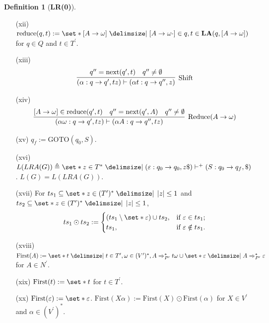 \documentclass[12pt]{paper}
\theoremstyle{definition}
\newtheorem*{definition}{Definition}
\begin{document}
\begin{definition}[\textbf{LR(0)}]
\begin{enumerate}
\item[(xii)] $\mathrm{reduce} ( q , t ) := \set*{ [ A \to \omega ] \mid [ A \to \omega \cdot ] \in q , t \in \mathbf{LA} ( q , [ A \to \omega ] ) }$ for $q \in Q$ and $t \in T^\prime$.
\item[(xiii)] $$\infer[\mathrm{Shift}]{ ( \alpha : q \to q^\prime , t z ) \vdash ( \alpha t : q \to q^{\prime \prime} , z ) }{ q^{\prime \prime} = \mathrm{next} ( q^\prime , t ) & q^{\prime \prime} \ne \emptyset }$$
\item[(xiv)] $$\infer[\mathrm{Reduce} (A \to \omega)]{ ( \alpha \omega : q \to q^\prime , t z ) \vdash ( \alpha A : q \to q^{\prime \prime} , t z ) }{ [ A \to \omega ] \in \mathrm{reduce} ( q^\prime , t ) & q^{\prime \prime} = \mathrm{next} ( q^\prime , A ) & q^{\prime \prime} \ne \emptyset }$$
\item[(xv)] $q_f := \mathrm{GOTO} ( q_0 , S )$.
\item[(xvi)] $L ( LRA ( G ) ) \triangleq \set*{ z \in T^\ast \mid ( \varepsilon : q_0 \to q_0 , z \$ ) \vdash^+ ( S : q_0 \to q_f , \$ ) }$. $L ( G ) = L ( LRA ( G ) )$.
\item[(xvii)] For $ts_1 \subseteq \set*{ z \in ( T^\prime )^\ast \mid \left| z \right| \le 1 }$ and $ts_2 \subseteq \set*{ z \in ( T^\prime )^\ast \mid \left| z \right| \le 1 }$, \[ ts_1 \odot ts_2 := \begin{cases} ( ts_1 \setminus \set*{ \varepsilon } ) \cup ts_2 , & \text{if } \varepsilon \in ts_1 ; \\ ts_1 , & \text{if } \varepsilon \notin ts_1 . \end{cases} \]
\item[(xviii)] $\mathrm{First} ( A ) := \set*{ t \mid t \in T^\prime , \omega \in ( V^\prime )^\ast , A \Rightarrow_{P^\prime}^\ast t \omega } \cup \set*{ \varepsilon \mid A \Rightarrow_{P^\prime}^\ast \varepsilon }$ for $A \in N^\prime$.
\item[(xix)] $\mathrm{First} ( t ) := \set*{ t }$ for $t \in T^\prime$.
\item[(xx)] $\mathrm{First} ( \varepsilon ) := \set*{ \varepsilon }$. $\mathrm{First} ( X \alpha ) := \mathrm{First} ( X ) \odot \mathrm{First} ( \alpha )$ for $X \in V^\prime$ and $\alpha \in ( V^\prime )^\ast $.
\end{enumerate}
\end{definition}

\newpage
\end{document}

